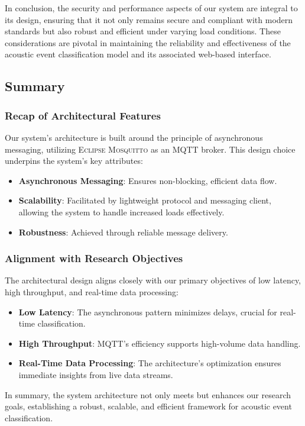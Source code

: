 In conclusion, the security and performance aspects of our system are integral to its design, ensuring that it not only remains secure and compliant with modern standards but also robust and efficient under varying load conditions. These considerations are pivotal in maintaining the reliability and effectiveness of the acoustic event classification model and its associated web-based interface.

\subsection{Summary}
\subsubsection{Recap of Architectural Features}
Our system's architecture is built around the principle of asynchronous messaging, utilizing \textsc{Eclipse Mosquitto} as an MQTT broker. This design choice underpins the system's key attributes:

\begin{itemize}
  \item \textbf{Asynchronous Messaging}: Ensures non-blocking, efficient data flow.
  \item \textbf{Scalability}: Facilitated by lightweight protocol and messaging client, allowing the system to handle increased loads effectively.
  \item \textbf{Robustness}: Achieved through reliable message delivery.
\end{itemize}

\subsubsection{Alignment with Research Objectives}
The architectural design aligns closely with our primary objectives of low latency, high throughput, and real-time data processing:

\begin{itemize}
  \item \textbf{Low Latency}: The asynchronous pattern minimizes delays, crucial for real-time classification.
  \item \textbf{High Throughput}: MQTT's efficiency supports high-volume data handling.
  \item \textbf{Real-Time Data Processing}: The architecture's optimization ensures immediate insights from live data streams.
\end{itemize}

In summary, the system architecture not only meets but enhances our research goals, establishing a robust, scalable, and efficient framework for acoustic event classification.
